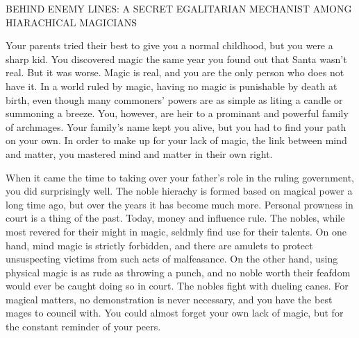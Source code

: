 \documentclass[char]{guildcamp3}
\begin{document}
\name{\cNobleOne{}}

\updatemacro{\cNPC}{
  \unknownplayer %
  }








BEHIND ENEMY LINES: A SECRET EGALITARIAN MECHANIST AMONG HIARACHICAL MAGICIANS

Your parents tried their best to give you a normal childhood, but you were a sharp kid. You discovered magic the same year you found out that Santa wasn't real. But it was worse. Magic is real, and you are the only person who does not have it. In a world ruled by magic, having no magic is punishable by death at birth, even though many commoners' powers are as simple as liting a candle or summoning a breeze. You, however, are heir to a prominant and powerful family of archmages. Your family's name kept you alive, but you had to find your path on your own. In order to make up for your lack of magic, the link between mind and matter, you mastered mind and matter in their own right.

When it came the time to taking over your father's role in the ruling government, you did surprisingly well. The noble hierachy is formed based on magical power a long time ago, but over the years it has become much more. Personal prowness in court is a thing of the past. Today, money and influence rule. The nobles, while most revered for their might in magic, seldmly find use for their talents. On one hand, mind magic is strictly forbidden, and there are amulets to protect unsuspecting victims from such acts of malfeasance. On the other hand, using physical magic is as rude as throwing a punch, and no noble worth their feafdom would ever be caught doing so in court. The nobles fight with dueling canes. For magical matters, no demonstration is never necessary, and you have the best mages to council with. You could almost forget your own lack of magic, but for the constant reminder of your peers.
\end{document}
